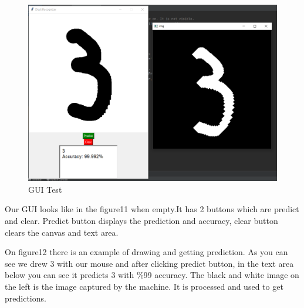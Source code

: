 \documentclass[onecolumn]{article}
\begin{document}
\begin{figure}[h!]
\begin{minipage}[b]{0.6\textwidth}
    \includegraphics[width=\textwidth]{test.PNG}
    \caption{GUI Test}
  \end{minipage}
\end{figure}

Our GUI looks like in the figure11 when empty.It has 2 buttons which are predict and clear. Predict button displays the prediction and accuracy, clear button clears the canvas and text area. 

On figure12 there is an example of drawing and getting prediction. As you can see we drew 3 with our mouse and after clicking predict button, in the text area below you can see it predicts 3 with \%99 accuracy. The black and white image on the left is the image captured by the machine. It is processed and used to get predictions.
\vspace{5mm}
\end{document}
